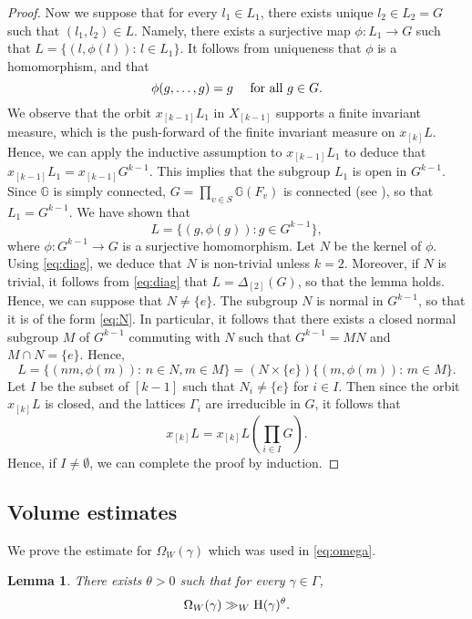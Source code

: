 \documentclass[11pt,reqno,a4paper]{amsart}
\numberwithin{equation}{section}
\newcommand{\bG}{\mathbb{G}}
\theoremstyle{theorem}
\newtheorem{lemma}[theorem]{Lemma}
\theoremstyle{definition}
\begin{document}
\begin{proof}
	Now we suppose that for every $l_1\in L_1$, there exists unique $l_2\in L_2=G$ such that $(l_1,l_2)\in L$.
	Namely, there exists a surjective map $\phi:L_1\to G$ such that
	$L=\{(l,\phi(l)):\, l\in L_1\}$.
	It follows from uniqueness that $\phi$ is a homomorphism,
	and that 
	\begin{equation}
	\label{eq:diag}
	\phi(g,\ldots,g)=g\quad\hbox{ for all $g\in G$.}
	\end{equation}
	We observe that the orbit $x_{[k-1]}L_1$ in $X_{[k-1]}$ supports a finite invariant measure,
	which is the push-forward of the finite invariant measure on $x_{[k]}L$.
	Hence, we can apply the inductive assumption to 
	$x_{[k-1]}L_1$ to deduce that 
	$x_{[k-1]}L_1=x_{[k-1]}G^{k-1}$.
	This implies that the subgroup  $L_1$ is open in $G^{k-1}$.
	Since $\bG$ is simply connected, $G=\prod_{v\in S} \bG(F_v)$ is connected (see \cite[Prop.~7.6]{PR}),
	so that $L_1=G^{k-1}$. We have shown that
	$$
	L=\{(g,\phi(g)): g\in G^{k-1}\},
	$$
	where $\phi:G^{k-1}\to G$ is a surjective homomorphism.
	Let $N$ be the kernel of $\phi$. 
	Using \eqref{eq:diag}, we deduce that $N$ is non-trivial unless $k=2$.
	Moreover, if $N$ is trivial, it follows from \eqref{eq:diag} that $L=\Delta_{[2]}(G)$,
	so that the lemma holds. Hence, we can suppose that $N\ne \{e\}$.
	The subgroup $N$ is normal in $G^{k-1}$,
	so that it is of the form \eqref{eq:N}.
	In particular, it follows that there exists a closed normal subgroup $M$ of $G^{k-1}$
	commuting with $N$
	such that $G^{k-1}=MN$ and $M\cap N=\{e\}$. Hence,
	$$
	L= \{(nm,\phi(m)):\, n\in N,m\in M\}=(N\times\{e\})\{(m,\phi(m)): \,m\in M\}.
	$$
	Let $I$ be the subset of $[k-1]$ such that $N_i\ne \{e\}$ for $i\in I$.
	Then since the orbit $x_{[k]}L$ is closed, and the lattices $\Gamma_i$ are irreducible in $G$,
	it follows that 
	$$
	x_{[k]}L=x_{[k]}L \left(\prod_{i\in I} G\right).
	$$
	Hence, if $I\ne \emptyset$, we can complete the proof by induction.
\end{proof}


\subsection{Volume estimates}

We prove the estimate for $\Omega_W(\gamma)$ which was used in \eqref{eq:omega}.

\begin{lemma}
	\label{l:volume}
	There exists $\theta>0$ such that for every $\gamma\in \Gamma$, 
	$$
	\Omega_W(\gamma)\gg_W \hbox{\rm H}(\gamma)^\theta.
	$$
\end{lemma}
\end{document}
